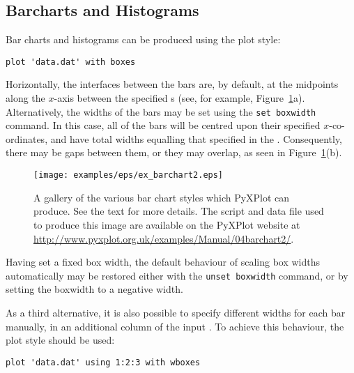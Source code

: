 \subsection{Barcharts and Histograms}
\label{sec:barcharts}

Bar charts and histograms can be produced using the  plot style:

\begin{verbatim}
plot 'data.dat' with boxes
\end{verbatim}

\noindent Horizontally, the interfaces between the bars are, by default, at the
midpoints along the $x$-axis between the specified \datapoint s (see, for
example, Figure~\ref{fig:ex_barchart2}a).  Alternatively, the widths of the
bars may be set using the {\tt set boxwidth} command. In this case, all of
the bars will be centred upon their specified $x$-co-ordinates, and have total
widths equalling that specified in the . Consequently, there may be
gaps between them, or they may overlap, as seen in
Figure~\ref{fig:ex_barchart2}(b).

\begin{figure}
\begin{center}
\texttt{[image: examples/eps/ex\_barchart2.eps]}
\end{center}
\caption[A gallery of the various bar chart styles which PyXPlot can produce]
{A gallery of the various bar chart styles which PyXPlot can produce.
See the text for more details.  The script and data file used to produce this
image are available on the PyXPlot website at
\protect\url{http://www.pyxplot.org.uk/examples/Manual/04barchart2/}.}
\label{fig:ex_barchart2}
\end{figure}

Having set a fixed box width, the default behaviour of scaling box widths
automatically may be restored either with the {\tt unset boxwidth} command,
or by setting the boxwidth to a negative width.

As a third alternative, it is also possible to specify different widths for
each bar manually, in an additional column of the input \datafile. To achieve
this behaviour, the  plot style should be used:

\begin{verbatim}
plot 'data.dat' using 1:2:3 with wboxes
\end{verbatim}

